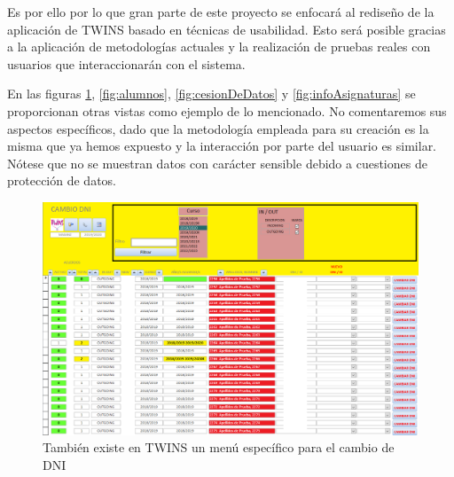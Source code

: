 Es por ello por lo que gran parte de este proyecto se enfocará al rediseño de la aplicación de TWINS basado en técnicas de usabilidad. Esto será posible gracias a la aplicación de metodologías actuales y la realización de pruebas reales con usuarios que interaccionarán con el sistema.

En las figuras \ref{fig:cambioDNI}, \ref{fig:alumnos}, \ref{fig:cesionDeDatos} y \ref{fig:infoAsignaturas} se proporcionan otras vistas como ejemplo de lo mencionado. No comentaremos sus aspectos específicos, dado que la metodología empleada para su creación es la misma que ya hemos expuesto y la interacción por parte del usuario es similar. Nótese que no se muestran datos con carácter sensible debido a cuestiones de protección de datos.


\begin{figure}
	\includegraphics[width=\textwidth]{img/Capturas de TWINS/cambioDNI.png}
	\caption[Menú de cambio de DNI]{También existe en TWINS un menú específico para el cambio de DNI}
	\label{fig:cambioDNI}
\end{figure}


